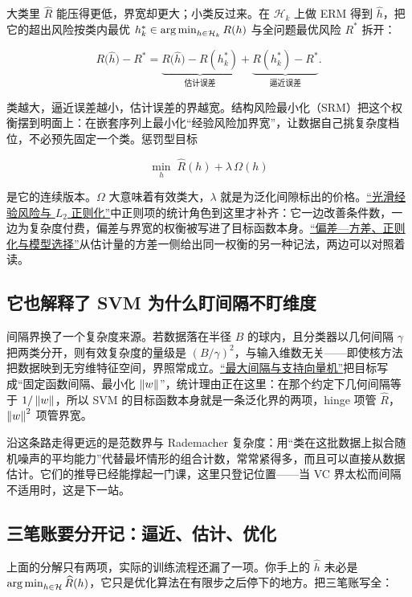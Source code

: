大类里 \(\widehat R\) 能压得更低，界宽却更大；小类反过来。在 \(\mathcal{H}_k\) 上做 ERM 得到 \(\widehat h\)，把它的超出风险按类内最优 \(h_k^*\in\operatorname*{arg\,min}_{h\in\mathcal{H}_k}R(h)\) 与全问题最优风险 \(R^*\) 拆开：

\[
R\bigl(\widehat h\bigr)-R^*
=\underbrace{R\bigl(\widehat h\bigr)-R(h_k^*)}_{\text{估计误差}}
+\underbrace{R(h_k^*)-R^*}_{\text{逼近误差}}.
\]

类越大，逼近误差越小，估计误差的界越宽。结构风险最小化（SRM）把这个权衡摆到明面上：在嵌套序列上最小化``经验风险加界宽''，让数据自己挑复杂度档位，不必预先固定一个类。惩罚型目标

\[
\min_{h}\;\widehat R(h)+\lambda\,\Omega(h)
\]

是它的连续版本。\(\Omega\) 大意味着有效类大，\(\lambda\) 就是为泛化间隙标出的价格。\hyperref[sec:09-Convex-Optimization/07-Applications/01]{``光滑经验风险与 \(L_2\) 正则化''}中正则项的统计角色到这里才补齐：它一边改善条件数，一边为复杂度付费，偏差与界宽的权衡被写进了目标函数本身。\hyperref[sec:11-Mathematical-Statistics/06-Resampling-and-Model-Selection/04]{``偏差---方差、正则化与模型选择''}从估计量的方差一侧给出同一权衡的另一种记法，两边可以对照着读。

\subsection{它也解释了 SVM 为什么盯间隔不盯维度}

间隔界换了一个复杂度来源。若数据落在半径 \(B\) 的球内，且分类器以几何间隔 \(\gamma\) 把两类分开，则有效复杂度的量级是 \((B/\gamma)^2\)，与输入维数无关——即使核方法把数据映到无穷维特征空间，界照常成立。\hyperref[sec:09-Convex-Optimization/07-Applications/03]{``最大间隔与支持向量机''}把目标写成``固定函数间隔、最小化 \(\left\lVert w\right\rVert\)''，统计理由正在这里：在那个约定下几何间隔等于 \(1/\left\lVert w\right\rVert\)，所以 SVM 的目标函数本身就是一条泛化界的两项，hinge 项管 \(\widehat R\)，\(\left\lVert w\right\rVert^2\) 项管界宽。

沿这条路走得更远的是范数界与 Rademacher 复杂度：用``类在这批数据上拟合随机噪声的平均能力''代替最坏情形的组合计数，常常紧得多，而且可以直接从数据估计。它们的推导已经能撑起一门课，这里只登记位置——当 VC 界太松而间隔不适用时，这是下一站。

\subsection{三笔账要分开记：逼近、估计、优化}

上面的分解只有两项，实际的训练流程还漏了一项。你手上的 \(\widehat h\) 未必是 \(\operatorname*{arg\,min}_{h\in\mathcal{H}}\widehat R(h)\)，它只是优化算法在有限步之后停下的地方。把三笔账写全：

